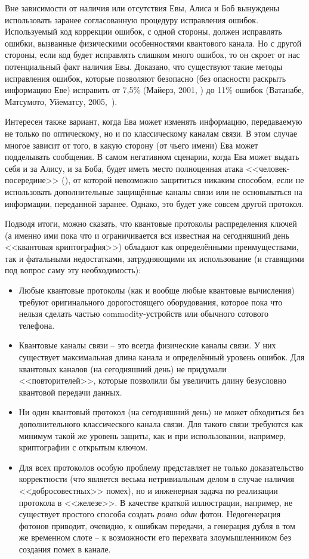 Вне зависимости от наличия или отсутствия Евы, Алиса и Боб вынуждены использовать заранее согласованную процедуру исправления ошибок. Используемый код коррекции ошибок, с одной стороны, должен исправлять ошибки, вызванные физическими особенностями квантового канала. Но с другой стороны, если код будет исправлять слишком много ошибок, то он скроет от нас потенциальный факт наличия Евы. Доказано, что существуют такие методы исправления ошибок, которые позволяют безопасно (без опасности раскрыть информацию Еве) исправить от 7,5\% (Майерз, 2001, \cite{Mayers:2001}) до 11\% ошибок (Ватанабе, Матсумото, Уйематсу, 2005,~\cite{Watanabe:Matsumoto:Uyematsu:2005}).

Интересен также вариант, когда Ева может изменять информацию, передаваемую не только по оптическому, но и по классическому каналам связи. В этом случае многое зависит от того, в какую сторону (от чьего имени) Ева может подделывать сообщения. В самом негативном сценарии, когда Ева может выдать себя и за Алису, и за Боба, будет иметь место полноценная атака <<человек-посередине>> (), от которой невозможно защититься никаким способом, если не использовать дополнительные защищённые каналы связи или не основываться на информации, переданной заранее. Однако, это будет уже совсем другой протокол.

Подводя итоги, можно сказать, что квантовые протоколы распределения ключей (а именно ими пока что и ограничивается вся известная на сегодняшний день <<квантовая криптография>>) обладают как определёнными преимуществами, так и фатальными недостатками, затрудняющими их использование (и ставящими под вопрос саму эту необходимость):

\begin{itemize}
	\item Любые квантовые протоколы (как и вообще любые квантовые вычисления) требуют оригинального дорогостоящего оборудования, которое пока что нельзя сделать частью commodity-устройств или обычного сотового телефона.
	\item Квантовые каналы связи -- это всегда физические каналы связи. У них существует максимальная длина канала и определённый уровень ошибок. Для квантовых каналов (на сегодняшний день) не придумали <<повторителей>>, которые позволили бы увеличить длину безусловно квантовой передачи данных.
	\item Ни один квантовый протокол (на сегодняшний день) не может обходиться без дополнительного классического канала связи. Для такого связи требуются как минимум такой же уровень защиты, как и при использовании, например, криптографии с открытым ключом.
	\item Для всех протоколов особую проблему представляет не только доказательство корректности (что является весьма нетривиальным делом в случае наличия <<добросовестных>> помех), но и инженерная задача по реализации протокола в <<железе>>. В качестве краткой иллюстрации, например, не существует простого способа создать \emph{ровно один} фотон. Недогенерация фотонов приводит, очевидно, к ошибкам передачи, а генерация дубля в том же временном слоте -- к возможности его перехвата злоумышленником без создания помех в канале.
\end{itemize}

